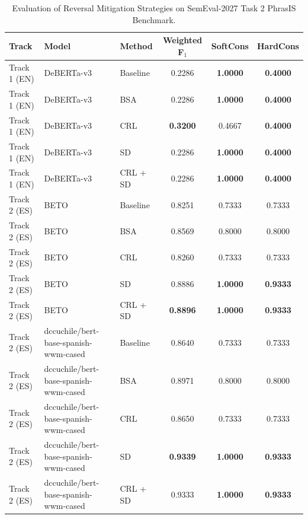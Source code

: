\begin{table}[ht]
\centering
\small
\begin{tabular}{lll ccc}
\toprule
\textbf{Track} & \textbf{Model} & \textbf{Method} & \textbf{Weighted F$_1$} & \textbf{SoftCons} & \textbf{HardCons} \\
\midrule
Track 1 (EN) & DeBERTa-v3 & Baseline & 0.2286 & \textbf{1.0000} & \textbf{0.4000} \\
Track 1 (EN) & DeBERTa-v3 & BSA & 0.2286 & \textbf{1.0000} & \textbf{0.4000} \\
Track 1 (EN) & DeBERTa-v3 & CRL & \textbf{0.3200} & 0.4667 & \textbf{0.4000} \\
Track 1 (EN) & DeBERTa-v3 & SD & 0.2286 & \textbf{1.0000} & \textbf{0.4000} \\
Track 1 (EN) & DeBERTa-v3 & CRL + SD & 0.2286 & \textbf{1.0000} & \textbf{0.4000} \\
\midrule
Track 2 (ES) & BETO & Baseline & 0.8251 & 0.7333 & 0.7333 \\
Track 2 (ES) & BETO & BSA & 0.8569 & 0.8000 & 0.8000 \\
Track 2 (ES) & BETO & CRL & 0.8260 & 0.7333 & 0.7333 \\
Track 2 (ES) & BETO & SD & 0.8886 & \textbf{1.0000} & \textbf{0.9333} \\
Track 2 (ES) & BETO & CRL + SD & \textbf{0.8896} & \textbf{1.0000} & \textbf{0.9333} \\
\midrule
Track 2 (ES) & dccuchile/bert-base-spanish-wwm-cased & Baseline & 0.8640 & 0.7333 & 0.7333 \\
Track 2 (ES) & dccuchile/bert-base-spanish-wwm-cased & BSA & 0.8971 & 0.8000 & 0.8000 \\
Track 2 (ES) & dccuchile/bert-base-spanish-wwm-cased & CRL & 0.8650 & 0.7333 & 0.7333 \\
Track 2 (ES) & dccuchile/bert-base-spanish-wwm-cased & SD & \textbf{0.9339} & \textbf{1.0000} & \textbf{0.9333} \\
Track 2 (ES) & dccuchile/bert-base-spanish-wwm-cased & CRL + SD & 0.9333 & \textbf{1.0000} & \textbf{0.9333} \\
\bottomrule
\end{tabular}
\caption{Evaluation of Reversal Mitigation Strategies on SemEval-2027 Task 2 PhrasIS Benchmark.}
\label{tab:main_results}
\end{table}